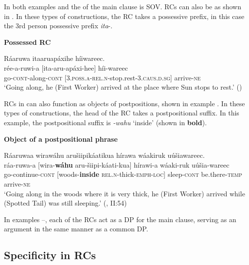 \documentclass[output=paper]{LSP/langsci}
\begin{document}
In both examples  and  the  of the main clause is SOV. RCs can also be  as shown in . In these types of constructions, the  RC takes a possessive prefix, in this case the 3rd person possessive prefix \textit{ita}-.

\ea \textbf{Possessed RC} \label{boyle4}

\glll R\'aaruwa  {\ob}itaaruap\'axihe{\cb}   h\'iiwareec.\\
r\'ee-a-ruwi-a  [ita-aru-ap\'axi-hee] h\'ii-wareec\\
go-\textsc{cont}-along-\textsc{cont} [\textsc{3.poss.a-rel.n}-stop.rest-\textsc{3.caus.d.sg}] arrive-\textsc{ne}\\
\trans `Going along, he (First Worker) arrived at the place where Sun stops to rest.' (\citealt[I: 21]{Lowie1939})
\z

RCs in  can also function as objects of postpositions, shown in example . In these types of constructions, the head of the RC takes a postpositional suffix. In this example, the postpositional suffix is \textit{-wahu} `inside' (shown in \textbf{bold}). 

\ea \textbf{Object of a postpositional phrase} \label{boyle5}

\glll R\'aaruwaa   {\ob}wiraw\'ahu  aru\v{s}iipik\'aatikua{\cb}   h\'irawa w\'aakiruk u\'u\v{s}iawareec.\\
r\'aa-ruwa-a [wira-\textbf{w\'ahu} aru-\v{s}iipi-k\'aati-kua] h\'irawi-a w\'aaki-ruk u\'u\v{s}ia-wareec\\     
go-continue-\textsc{cont} [woods-\textbf{inside}  \textsc{rel.n}-thick-\textsc{emph-loc}] sleep-\textsc{cont} be.there-\textsc{temp} arrive-\textsc{ne}\\
\trans `Going along in the woods where it is very thick, he (First Worker) arrived while (Spotted Tail) was still sleeping.' (\citealt{Lowie1939}, II:54)
\z

In examples --, each of the RCs act as a DP for the main clause, serving as an argument in the same manner as a common DP.

\subsection{Specificity in  RCs}\label{sec:boyle:2.2}
\end{document}
